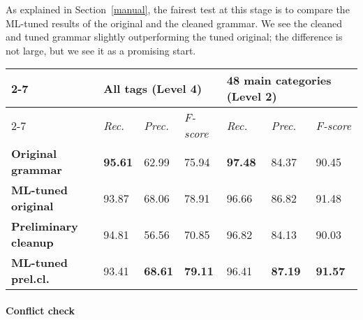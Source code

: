 \documentclass[11pt]{article}
\begin{document}
As explained in Section~\ref{manual}, the fairest test at this stage is to compare the
ML-tuned results of the original and the cleaned grammar.
We see the cleaned and tuned grammar slightly outperforming the tuned original;
the difference is not large, but we see it as a promising start.







\begin{table*}[t]
\centering
\begin{tabular}{l|l|l|l|l|l|l|}
\cline{2-7}
                                                 & \multicolumn{3}{l|}{\textbf{All tags} (Level 4)}            & \multicolumn{3}{l|}{\textbf{48 main categories} (Level 2)}  \\ \cline{2-7} 
                                                 & \textit{Rec.} & \textit{Prec.} & \textit{F-score} & \textit{Rec.} & \textit{Prec.} & \textit{F-score} \\ \hline
\multicolumn{1}{|l|}{\textbf{Original grammar}}     
					    & \textbf{95.61}  & 62.99         &  75.94         & \textbf{97.48}  &  84.37           &  90.45           \\ \hline
\multicolumn{1}{|l|}{\textbf{ML-tuned original}}    
					    & 93.87          & 68.06             &  78.91              & 96.66          &  86.82           &  91.48            \\ \hline
\multicolumn{1}{|l|}{\textbf{Preliminary cleanup}}  
					   & 94.81           & 56.56             & 70.85               &  96.82         &  84.13           &  90.03           \\ \hline
\multicolumn{1}{|l|}{\textbf{ML-tuned prel.cl.}}      
					   & 93.41           & \textbf{68.61}  & \textbf{79.11}   &  96.41        &  \textbf{87.19}   &  \textbf{91.57}           \\ \hline
\end{tabular}
\caption{Preliminary evaluation on words, excluding punctuation, for levels 4 and 2 of granularity.}
\label{table:res}
\end{table*}

\paragraph{Conflict check}
\end{document}
